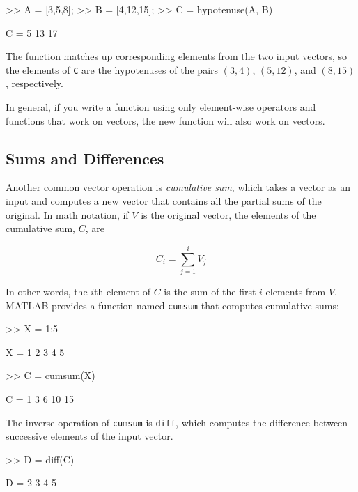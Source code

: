 \documentclass[../../book.tex]{subfiles}
\begin{document}
\begin{code}
>> A = [3,5,8];
>> B = [4,12,15];
>> C = hypotenuse(A, B)

C = 5    13    17
\end{code}

The function matches up corresponding elements from the two
input vectors, so the elements of \lstinline{C} are the hypotenuses of
the pairs $(3,4)$, $(5,12)$, and $(8,15)$, respectively.

In general, if you write a function using only element-wise
operators and functions that work on vectors, the new
function will also work on vectors.


\subsection{Sums and Differences}

Another common vector operation is \emph{cumulative sum}, which takes a vector as an input and computes a new vector that contains all the partial sums of the original.  In math notation, if $V$ is the original vector, the elements of the cumulative sum, $C$, are


\begin{equation*}
C_i = \sum_{j=1}^i V_j
\end{equation*}

In other words, the $i$th element of $C$ is the sum of the first
$i$ elements from $V$.  MATLAB provides a function named \lstinline{cumsum} that computes cumulative sums:


\begin{code}
>> X = 1:5

X = 1     2     3     4     5

>> C = cumsum(X)

C = 1     3     6    10    15
\end{code}

The inverse operation of \lstinline{cumsum} is \lstinline{diff}, which computes
the difference between successive elements of the input vector.


\begin{code}
>> D = diff(C)

D = 2     3     4     5
\end{code}
\end{document}
